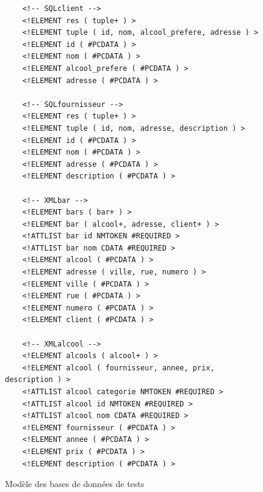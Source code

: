 \documentclass[a4paper,10pt]{article}
\begin{document}
\begin{figure}[ht!]
\begin{verbatim}
    <!-- SQLclient -->
    <!ELEMENT res ( tuple+ ) >
    <!ELEMENT tuple ( id, nom, alcool_prefere, adresse ) >
    <!ELEMENT id ( #PCDATA ) >
    <!ELEMENT nom ( #PCDATA ) >
    <!ELEMENT alcool_prefere ( #PCDATA ) >
    <!ELEMENT adresse ( #PCDATA ) >
    
    <!-- SQLfournisseur -->
    <!ELEMENT res ( tuple+ ) >
    <!ELEMENT tuple ( id, nom, adresse, description ) >
    <!ELEMENT id ( #PCDATA ) >
    <!ELEMENT nom ( #PCDATA ) >
    <!ELEMENT adresse ( #PCDATA ) >
    <!ELEMENT description ( #PCDATA ) >
    
    <!-- XMLbar -->
    <!ELEMENT bars ( bar+ ) >
    <!ELEMENT bar ( alcool+, adresse, client+ ) >
    <!ATTLIST bar id NMTOKEN #REQUIRED >
    <!ATTLIST bar nom CDATA #REQUIRED >
    <!ELEMENT alcool ( #PCDATA ) >
    <!ELEMENT adresse ( ville, rue, numero ) >
    <!ELEMENT ville ( #PCDATA ) >
    <!ELEMENT rue ( #PCDATA ) >
    <!ELEMENT numero ( #PCDATA ) >
    <!ELEMENT client ( #PCDATA ) >
    
    <!-- XMLalcool -->
    <!ELEMENT alcools ( alcool+ ) >
    <!ELEMENT alcool ( fournisseur, annee, prix, description ) >
    <!ATTLIST alcool categorie NMTOKEN #REQUIRED >
    <!ATTLIST alcool id NMTOKEN #REQUIRED >
    <!ATTLIST alcool nom CDATA #REQUIRED >
    <!ELEMENT fournisseur ( #PCDATA ) >
    <!ELEMENT annee ( #PCDATA ) >
    <!ELEMENT prix ( #PCDATA ) >
    <!ELEMENT description ( #PCDATA ) >
\end{verbatim}
\caption{Modèle des bases de données de tests}
\end{figure}
\end{document}
